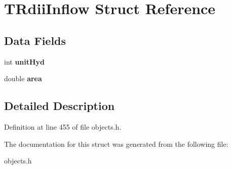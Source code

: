 \hypertarget{struct_t_rdii_inflow}{}\section{T\+Rdii\+Inflow Struct Reference}
\label{struct_t_rdii_inflow}
\subsection*{Data Fields}
\begin{DoxyCompactItemize}
\item 
\mbox{\label{struct_t_rdii_inflow_ad0850ee1a4fead60e7ec07de74a3ed0e}} 
int {\bfseries unit\+Hyd}
\item 
\mbox{\label{struct_t_rdii_inflow_ae517bffd82b9428b4f1d9500ea01c04f}} 
double {\bfseries area}
\end{DoxyCompactItemize}


\subsection{Detailed Description}


Definition at line 455 of file objects.\+h.



The documentation for this struct was generated from the following file\+:\begin{DoxyCompactItemize}
\item 
objects.\+h\end{DoxyCompactItemize}
